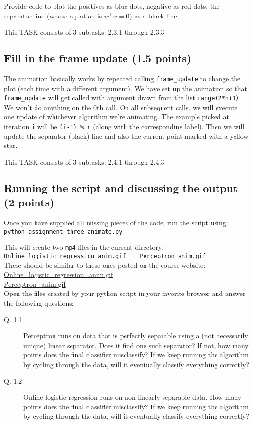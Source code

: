 \documentclass{article}
\begin{document}
Provide code to plot the positives as blue dots, negative as red dots, the separator line (whose equation is $w^\top x = 0$) as a black line.

This TASK consists of 3 subtasks: 2.3.1 through 2.3.3

\subsection{Fill in the frame update (1.5 points)}

The animation basically works by repeated calling {\tt frame\_update} to change the plot (each time with a different argument).
We have set up the animation so that {\tt frame\_update} will get called with argument drawn from the list {\tt range(2*n+1)}.
We won't do anything on the $0$th call. On all subsequent calls, we will execute one update of whichever algorithm we're animating.
The example picked at iteration {\tt i} will be {\tt (i-1) \% n} (along with the corresponding label). 
Then we will update the separator (black) line and also the current point marked with a yellow star.

This TASK consists of 3 subtasks: 2.4.1 through 2.4.3

\subsection{Running the script and discussing the output (2 points)}

Once you have supplied all missing pieces of the code, run the script using:\\
{\tt python assignment\_three\_animate.py}

This will create two {\tt mp4} files in the current directory:\\
\verb#Online_logistic_regression_anim.gif    Perceptron_anim.gif#\\
These should be similar to these ones posted on the course website:\\
\href{http://dept.stat.lsa.umich.edu/~tewaria/teaching/STATS607A-Fall2017/Online_logistic_regression_anim.gif}{Online\_logistic\_regression\_anim.gif}\\
\href{http://dept.stat.lsa.umich.edu/~tewaria/teaching/STATS607A-Fall2017/Perceptron_anim.gif}{Perceptron\_anim.gif}\\
Open the files created by your python script in your favorite browser and
answer the following questions:
\begin{description}
\item[Q. 1.1]
Perceptron runs on data that is perfectly separable using a (not necessarily unique) linear separator. Does it find one such separator?
If not, how many points does the final classifier misclassify? If we keep running the algorithm by cycling through the data, will it eventually classify everything correctly?
\item[Q. 1.2]
Online logistic regression runs on non linearly-separable data. How many points does the final classifier misclassify? 
If we keep running the algorithm by cycling through the data, will it eventually classify everything correctly?  
\end{description}
\end{document}
